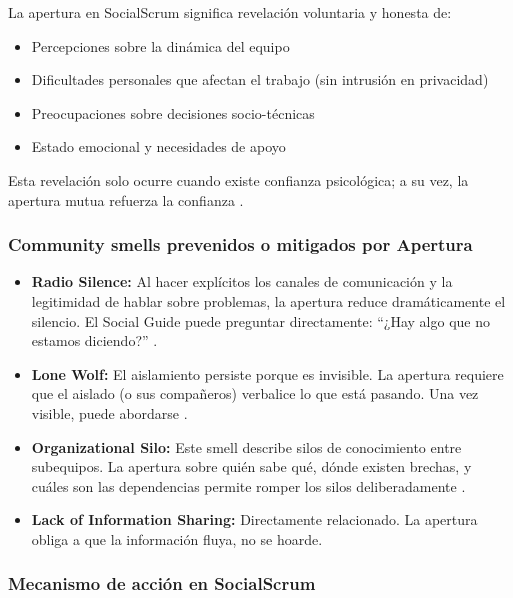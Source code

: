 La apertura en SocialScrum significa revelación voluntaria y honesta de:
\begin{itemize}
\item Percepciones sobre la dinámica del equipo
\item Dificultades personales que afectan el trabajo (sin intrusión en privacidad)
\item Preocupaciones sobre decisiones socio-técnicas
\item Estado emocional y necesidades de apoyo
\end{itemize}

Esta revelación solo ocurre cuando existe confianza psicológica; a su vez, la apertura mutua refuerza la confianza \cite{wilson_all_2006}.

\subsubsection*{Community smells prevenidos o mitigados por Apertura}

\begin{itemize}

\item \textbf{Radio Silence:} Al hacer explícitos los canales de comunicación y la legitimidad de hablar sobre problemas, la apertura reduce dramáticamente el silencio. El Social Guide puede preguntar directamente: ``¿Hay algo que no estamos diciendo?'' \cite{saeeda2024nontechnicaldebt}.

\item \textbf{Lone Wolf:} El aislamiento persiste porque es invisible. La apertura requiere que el aislado (o sus compañeros) verbalice lo que está pasando. Una vez visible, puede abordarse \cite{caballero2022communitysmells}.

\item \textbf{Organizational Silo:} Este smell describe silos de conocimiento entre subequipos. La apertura sobre quién sabe qué, dónde existen brechas, y cuáles son las dependencias permite romper los silos deliberadamente \cite{caballero2022communitysmells}.

\item \textbf{Lack of Information Sharing:} Directamente relacionado. La apertura obliga a que la información fluya, no se hoarde.

\end{itemize}

\subsubsection*{Mecanismo de acción en SocialScrum}

